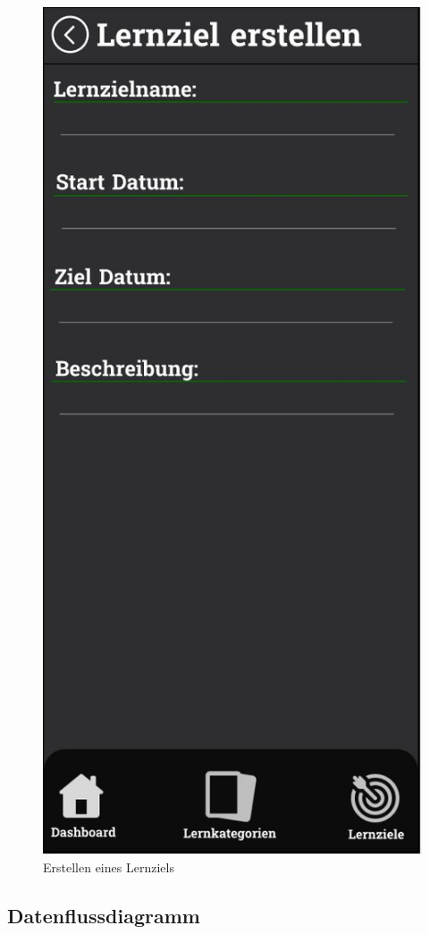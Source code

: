 \newpage

\begin{figure}[H]
  \centering
  \includegraphics[width=0.5\linewidth]{images/Mockups/LernzielErstellen.JPG}
  \caption{Erstellen eines Lernziels}
  \label{fig:lernziel-erstellen}
\end{figure}

\newpage

\subsection{Datenflussdiagramm}